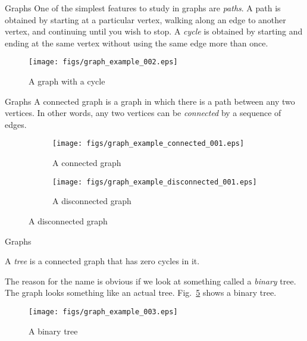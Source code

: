 \documentclass{beamer}
\begin{document}
    \begin{frame}{Graphs}
        One of the simplest features to study in graphs are \textit{paths}.
        A path is obtained by starting at a particular vertex, walking along an
        edge to another vertex, and continuing until you wish to stop. A
        \textit{cycle} is obtained by starting and ending at the same vertex without
        using the same edge more than once.
        \begin{figure}
            \centering
            \texttt{[image: figs/graph\_example\_002.eps]}
            \caption{A graph with a cycle}
            \label{fig:graph_example_002}
        \end{figure}
    \end{frame}
    \begin{frame}{Graphs}
        A connected graph is a graph in which there is a path
        between any two vertices. In other words, any two vertices
        can be \textit{connected} by a sequence of edges.
        \begin{figure}
            \centering
            \begin{subfigure}[b]{0.49\textwidth}
                \centering
                \texttt{[image: figs/graph\_example\_connected\_001.eps]}
                \caption{A connected graph}
                \label{fig:onnected_graph}
            \end{subfigure}
            \begin{subfigure}[b]{0.49\textwidth}
                \centering
                \texttt{[image: figs/graph\_example\_disconnected\_001.eps]}
                \caption{A disconnected graph}
                \label{fig:disonnected_graph}
            \end{subfigure}
        \end{figure}
    \end{frame}
    \begin{frame}{Graphs}
        \begin{definition}
            A \textit{tree} is a connected graph that has
            zero cycles in it.
        \end{definition}
        The reason for the name is obvious if we look at something called a
        \textit{binary} tree. The graph looks something like an actual tree.
        Fig.~\ref{fig:graph_example_003} shows a binary tree.
        \begin{figure}
            \centering
            \texttt{[image: figs/graph\_example\_003.eps]}
            \caption{A binary tree}
            \label{fig:graph_example_003}
        \end{figure}
    \end{frame}
\end{document}
